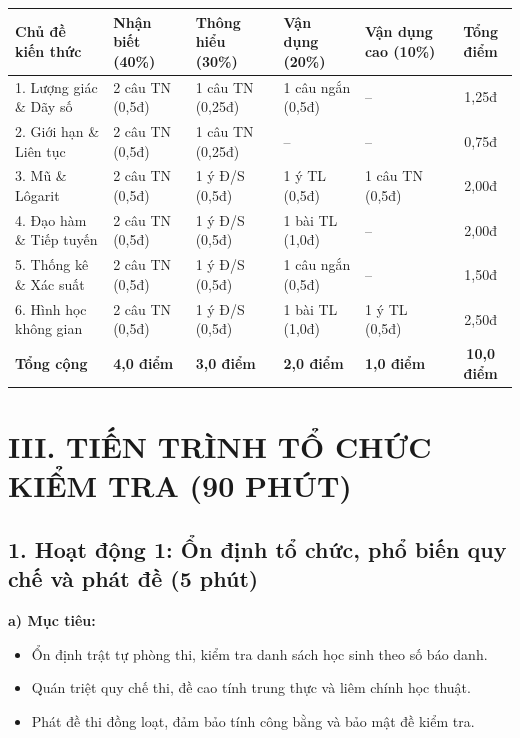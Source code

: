 \documentclass[12pt, a4paper]{article}
\begin{document}
\begin{center}
\begin{tabularx}{\textwidth}{|p{3.5cm}|X|X|X|X|c|}
\hline
\textbf{Chủ đề kiến thức} & \textbf{Nhận biết (40\%)} & \textbf{Thông hiểu (30\%)} & \textbf{Vận dụng (20\%)} & \textbf{Vận dụng cao (10\%)} & \textbf{Tổng điểm} \\
\hline
1. Lượng giác \& Dãy số & 2 câu TN (0,5đ) & 1 câu TN (0,25đ) & 1 câu ngắn (0,5đ) & -- & 1,25đ \\
\hline
2. Giới hạn \& Liên tục & 2 câu TN (0,5đ) & 1 câu TN (0,25đ) & -- & -- & 0,75đ \\
\hline
3. Mũ \& Lôgarit & 2 câu TN (0,5đ) & 1 ý Đ/S (0,5đ) & 1 ý TL (0,5đ) & 1 câu TN (0,5đ) & 2,00đ \\
\hline
4. Đạo hàm \& Tiếp tuyến & 2 câu TN (0,5đ) & 1 ý Đ/S (0,5đ) & 1 bài TL (1,0đ) & -- & 2,00đ \\
\hline
5. Thống kê \& Xác suất & 2 câu TN (0,5đ) & 1 ý Đ/S (0,5đ) & 1 câu ngắn (0,5đ) & -- & 1,50đ \\
\hline
6. Hình học không gian & 2 câu TN (0,5đ) & 1 ý Đ/S (0,5đ) & 1 bài TL (1,0đ) & 1 ý TL (0,5đ) & 2,50đ \\
\hline
\textbf{Tổng cộng} & \textbf{4,0 điểm} & \textbf{3,0 điểm} & \textbf{2,0 điểm} & \textbf{1,0 điểm} & \textbf{10,0 điểm} \\
\hline
\end{tabularx}
\end{center}

\vspace{5pt}

\section*{III. TIẾN TRÌNH TỔ CHỨC KIỂM TRA (90 PHÚT)}

\subsection*{1. Hoạt động 1: Ổn định tổ chức, phổ biến quy chế và phát đề (5 phút)}

\noindent \textbf{a) Mục tiêu:}
\begin{itemize}[leftmargin=0.6cm]
    \item Ổn định trật tự phòng thi, kiểm tra danh sách học sinh theo số báo danh.
    \item Quán triệt quy chế thi, đề cao tính trung thực và liêm chính học thuật.
    \item Phát đề thi đồng loạt, đảm bảo tính công bằng và bảo mật đề kiểm tra.
\end{itemize}
\end{document}
